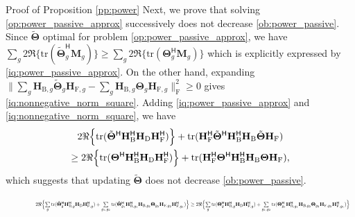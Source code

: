 \documentclass[journal]{IEEEtran}
\begin{document}
\begin{appendix}
\begin{subsection}{Proof of Proposition \ref{pp:power}}
		Next, we prove that solving \eqref{op:power_passive_approx} successively does not decrease \eqref{ob:power_passive}.
		Since $\tilde{\mathbf{\Theta}}$ optimal for problem \eqref{op:power_passive_approx}, we have $\sum_g 2 \Re\bigl\{ \mathrm{tr}(\tilde{\mathbf{\Theta}}_g^\mathsf{H} \mathbf{M}_g) \bigr\} \ge \sum_g 2 \Re\bigl\{ \mathrm{tr}(\mathbf{\Theta}_g^\mathsf{H} \mathbf{M}_g) \bigr\}$ which is explicitly expressed by \eqref{iq:power_passive_approx}.
		On the other hand, expanding $\lVert \sum_g \mathbf{H}_{\mathrm{B},g} \tilde{\mathbf{\Theta}}_g \mathbf{H}_{\mathrm{F},g} - \sum_g \mathbf{H}_{\mathrm{B},g} \mathbf{\Theta}_g \mathbf{H}_{\mathrm{F},g} \rVert _\mathrm{F}^2 \ge 0$ gives \eqref{iq:nonnegative_norm_square}.
		Adding \eqref{iq:power_passive_approx} and \eqref{iq:nonnegative_norm_square}, we have
		\begin{multline}
			2 \Re \Bigl\{\mathrm{tr}(\tilde{\mathbf{\Theta}}^\mathsf{H} \mathbf{H}_\mathrm{B}^\mathsf{H} \mathbf{H}_\mathrm{D} \mathbf{H}_\mathrm{F}^\mathsf{H}) \Bigr\} + \mathrm{tr}(\mathbf{H}_\mathrm{F}^\mathsf{H} \tilde{\mathbf{\Theta}}^\mathsf{H} \mathbf{H}_\mathrm{B}^\mathsf{H} \mathbf{H}_\mathrm{B} \tilde{\mathbf{\Theta}} \mathbf{H}_\mathrm{F}) \\
			\ge 2 \Re \Bigl\{\mathrm{tr}({\mathbf{\Theta}}^\mathsf{H} \mathbf{H}_\mathrm{B}^\mathsf{H} \mathbf{H}_\mathrm{D} \mathbf{H}_\mathrm{F}^\mathsf{H}) \Bigr\} + \mathrm{tr}(\mathbf{H}_\mathrm{F}^\mathsf{H} {\mathbf{\Theta}}^\mathsf{H} \mathbf{H}_\mathrm{B}^\mathsf{H} \mathbf{H}_\mathrm{B} {\mathbf{\Theta}} \mathbf{H}_\mathrm{F}),
		\end{multline}
		which suggests that updating $\tilde{\mathbf{\Theta}}$ does not decrease \eqref{ob:power_passive}.
		\begin{figure}
			\begin{equation}
				\label{iq:power_passive_approx}
				\resizebox{0.95\textwidth}{!}{
					$2 \Re \Bigl\{\sum\limits_g \mathrm{tr}(\tilde{\mathbf{\Theta}}_g^\mathsf{H} \mathbf{H}_{\mathrm{B},g}^\mathsf{H} \mathbf{H}_\mathrm{D} \mathbf{H}_{\mathrm{F},g}^\mathsf{H}) + \sum\limits_{g_1,g_2} \mathrm{tr}(\tilde{\mathbf{\Theta}}_{g_1}^\mathsf{H} \mathbf{H}_{\mathrm{B},g_1}^\mathsf{H} \mathbf{H}_{\mathrm{B},g_2} \mathbf{\Theta}_{g_2} \mathbf{H}_{\mathrm{F},g_2} \mathbf{H}_{\mathrm{F},g_1}^\mathsf{H})\Bigr\} \ge 2 \Re \Bigl\{\sum\limits_g \mathrm{tr}({\mathbf{\Theta}}_g^\mathsf{H} \mathbf{H}_{\mathrm{B},g}^\mathsf{H} \mathbf{H}_\mathrm{D} \mathbf{H}_{\mathrm{F},g}^\mathsf{H}) + \sum\limits_{g_1,g_2} \mathrm{tr}({\mathbf{\Theta}}_{g_1}^\mathsf{H} \mathbf{H}_{\mathrm{B},g_1}^\mathsf{H} \mathbf{H}_{\mathrm{B},g_2} \mathbf{\Theta}_{g_2} \mathbf{H}_{\mathrm{F},g_2} \mathbf{H}_{\mathrm{F},g_1}^\mathsf{H})\Bigr\}$
}
\end{equation}
\end{figure}
\end{subsection}
\end{appendix}
\end{document}
